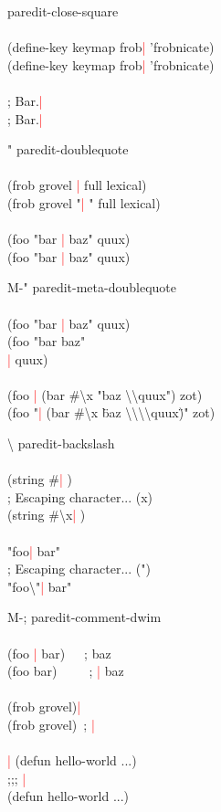 \documentclass[8pt,a4paper,landscape]{extarticle}
\newcommand{\csr}{\textcolor{red}{| }}
\begin{document}
\begin{multicols}{4}
\begin{eqlist}
\item[\rbrack] paredit-close-square\\
  \\
  (define-key keymap \lbrack frob\csr   \rbrack  'frobnicate)\\
  (define-key keymap \lbrack frob\rbrack \csr  'frobnicate)\\
  \\
  ; \lbrack Bar.\csr \\
  ; \lbrack Bar.\rbrack \csr \\


\item["] paredit-doublequote\\
  \\
  (frob grovel \csr full lexical)\\
  (frob grovel "\csr " full lexical)\\
  \\
  (foo "bar \csr baz" quux)\\
  (foo "bar \"\csr baz" quux)\\


\item[M-"] paredit-meta-doublequote\\
  \\
  (foo "bar \csr baz" quux)\\
  (foo "bar baz"\\
  \csr quux)\\
  \\
  (foo \csr (bar \#\textbackslash x "baz \textbackslash\textbackslash quux") zot)\\
  (foo "\csr (bar \#\textbackslash x \"baz \textbackslash\textbackslash\textbackslash\textbackslash quux\")" zot)\\


\item[\textbackslash] paredit-backslash\\
  \\
  (string \#\csr )\\
  ; Escaping character... (x)\\
  (string \#\textbackslash x\csr )\\
  \\
  "foo\csr bar"\\
  ; Escaping character... (")\\
  "foo\textbackslash "\csr bar"\\

\item[M-;] paredit-comment-dwim\\
  \\
  (foo \csr bar)~~~; baz\\
  (foo bar)~~~~~; \csr baz\\
  \\
  (frob grovel)\csr \\
  (frob grovel)~; \csr \\
  \\
  \csr (defun hello-world ...)\\
  ;;; \csr \\
  (defun hello-world ...)\\



\end{eqlist}
\end{multicols}
\end{document}

